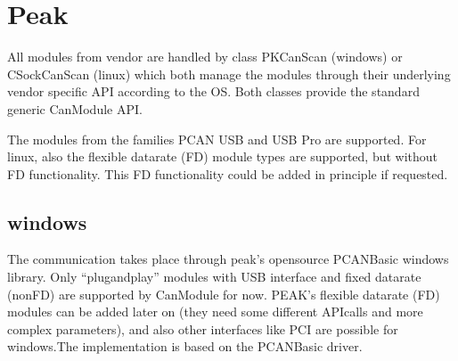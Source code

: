 \documentclass[a4paper,10pt,english]{sphinxmanual}
\begin{document}
\chapter{Peak}
\label{\detokenize{vendors/peak:peak}}\label{\detokenize{vendors/peak::doc}}
\sphinxAtStartPar
All modules from vendor {\hyperref[\detokenize{vendors/peak:peak}]{}} are handled by class PKCanScan (windows) or CSockCanScan (linux) which
both manage the modules through their underlying vendor specific API according to the OS.
Both classes provide the standard generic CanModule API.

\sphinxAtStartPar
The modules from the families PCAN USB and USB Pro are supported. For linux, also the flexible
datarate (FD) module types are supported, but without FD functionality. This FD functionality
could be added in principle if requested.


\section{windows}
\label{\detokenize{vendors/peak:windows}}
\sphinxAtStartPar
The communication takes place through peak’s open\sphinxhyphen{}source PCAN\sphinxhyphen{}Basic windows library. Only “plug\sphinxhyphen{}and\sphinxhyphen{}play”
modules with USB interface and fixed datarate (non\sphinxhyphen{}FD) are supported by CanModule for now. PEAK’s
flexible datarate (FD) modules can be added later on (they need some different API\sphinxhyphen{}calls and more complex parameters), and also
other interfaces like PCI are possible for windows.The implementation is based on the PCAN\sphinxhyphen{}Basic driver.
\end{document}
